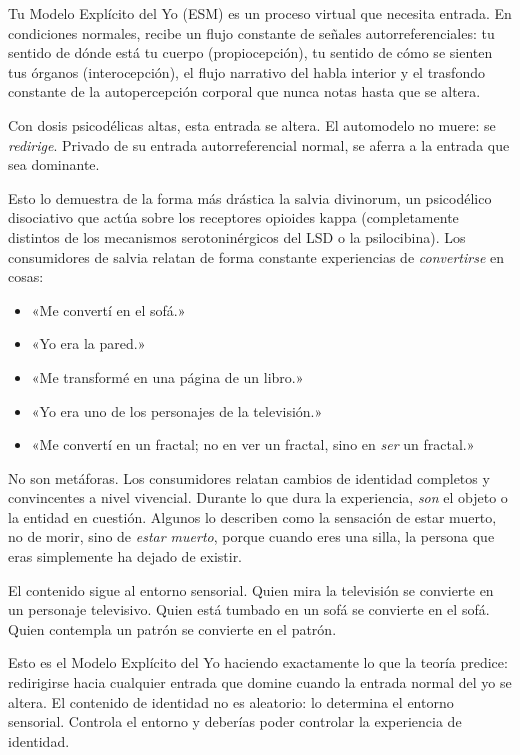 \documentclass[11pt, twoside, openright]{book}
\begin{document}
Tu Modelo Explícito del Yo (ESM) es un proceso virtual que necesita entrada. En condiciones normales, recibe un flujo constante de señales autorreferenciales: tu sentido de dónde está tu cuerpo (propiocepción), tu sentido de cómo se sienten tus órganos (interocepción), el flujo narrativo del habla interior y el trasfondo constante de la autopercepción corporal que nunca notas hasta que se altera.

Con dosis psicodélicas altas, esta entrada se altera. El automodelo no muere: se \textit{redirige}. Privado de su entrada autorreferencial normal, se aferra a la entrada que sea dominante.

Esto lo demuestra de la forma más drástica la salvia divinorum, un psicodélico disociativo que actúa sobre los receptores opioides kappa (completamente distintos de los mecanismos serotoninérgicos del LSD o la psilocibina). Los consumidores de salvia relatan de forma constante experiencias de \textit{convertirse} en cosas:

\begin{itemize}
  \item «Me convertí en el sofá.»
  \item «Yo era la pared.»
  \item «Me transformé en una página de un libro.»
  \item «Yo era uno de los personajes de la televisión.»
  \item «Me convertí en un fractal; no en ver un fractal, sino en \textit{ser} un fractal.»
\end{itemize}

No son metáforas. Los consumidores relatan cambios de identidad completos y convincentes a nivel vivencial. Durante lo que dura la experiencia, \textit{son} el objeto o la entidad en cuestión. Algunos lo describen como la sensación de estar muerto, no de morir, sino de \textit{estar muerto}, porque cuando eres una silla, la persona que eras simplemente ha dejado de existir.

El contenido sigue al entorno sensorial. Quien mira la televisión se convierte en un personaje televisivo. Quien está tumbado en un sofá se convierte en el sofá. Quien contempla un patrón se convierte en el patrón.

Esto es el Modelo Explícito del Yo haciendo exactamente lo que la teoría predice: redirigirse hacia cualquier entrada que domine cuando la entrada normal del yo se altera. El contenido de identidad no es aleatorio: lo determina el entorno sensorial. Controla el entorno y deberías poder controlar la experiencia de identidad.
\end{document}
